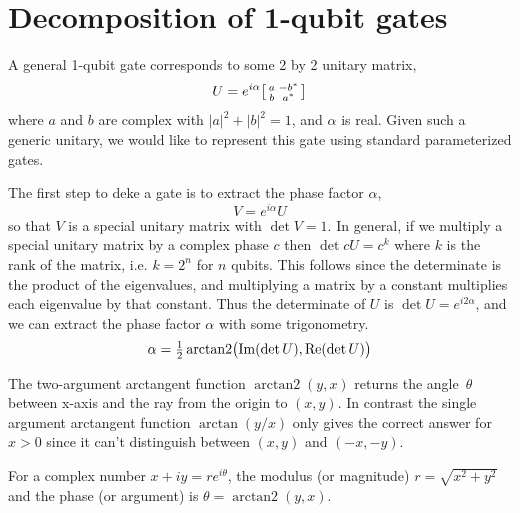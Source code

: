 


\clearpage
\section{Decomposition of 1-qubit gates}
A general 1-qubit gate corresponds to some 2 by 2 unitary matrix,
\[
U = 
e^{i\alpha}\begin{bsmallmatrix}
a & -b^* \\
b & a^*
\end{bsmallmatrix}\]
where $a$ and $b$ are complex with $|a|^2 + |b|^2 = 1$, and  $\alpha$ is real.
Given such a generic unitary, we would like to represent this gate using standard parameterized gates.   

The first step to deke a gate is to extract the phase factor $\alpha$,
\[
V = e^{i\alpha} U
\]
so that $V$ is a special unitary matrix with $\det V=1$. In general, if we multiply a special unitary matrix by a complex phase $c$ then $\det cU=c^k$ where $k$ is the rank of the matrix, i.e. $k=2^n$ for $n$ qubits. This follows since the determinate is the product of the eigenvalues, and multiplying a matrix by a constant multiplies each eigenvalue by that constant.
Thus the determinate of $U$ is $\det U=e^{i 2 \alpha }$, and we can extract the phase factor $\alpha$ with some trigonometry.
\[
\alpha = \tfrac{1}{2} \operatorname{arctan2}\bigl(\operatorname{Im}(\det U), \operatorname{Re}(\det U)\bigr)
\label{phase_extraction}
\]

The two-argument arctangent function $\operatorname{arctan2}(y,x)$ returns the angle~$\theta$ between x-axis and the ray from the origin to $(x, y)$. In contrast the single argument arctangent function $\arctan(y/x)$ only gives the correct answer for $x>0$ since it can't distinguish between $(x,y)$ and $(-x, -y)$.
\begin{center}
\end{center}
For a complex number $x+iy = r e^{i\theta}$, the modulus (or magnitude) $r=\sqrt{x^2+y^2}$ and the phase (or argument) is $\theta = \operatorname{arctan2}(y,x)$. 

